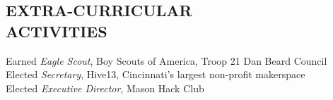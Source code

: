 \documentclass[margin]{res} %
\begin{document}
\begin{resume}

\section{EXTRA-CURRICULAR \\ ACTIVITIES} 

Earned {\it Eagle Scout}, Boy Scouts of America, Troop 21 Dan Beard Council \\
Elected {\it Secretary}, Hive13, Cincinnati's largest non-profit makerspace \\
Elected {\it Executive Director}, Mason Hack Club \\


\end{resume}
\end{document}
